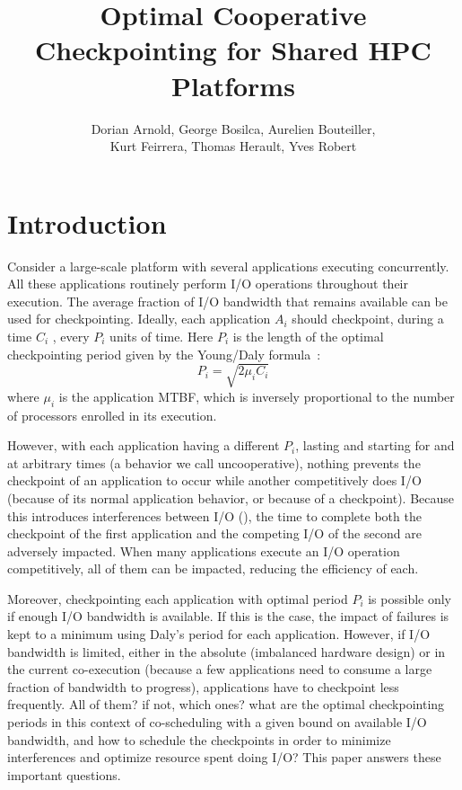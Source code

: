 \documentclass{article}
\author{Dorian Arnold, George Bosilca, Aurelien Bouteiller,\\
 Kurt Feirrera, Thomas Herault, Yves Robert}
\title{Optimal Cooperative Checkpointing for Shared HPC Platforms}
\begin{document}
\maketitle

\section{Introduction}

Consider a large-scale platform with several applications executing
concurrently. All these applications routinely perform I/O operations
throughout their execution. The average fraction of I/O bandwidth that
remains available can be used for checkpointing. Ideally, each application $A_{i}$
should checkpoint, during a time $C_{i}$ , 
every $P_{i}$ units of time. Here $P_{i}$ is the length of the
optimal checkpointing period given by the Young/Daly formula~\cite{young74,daly04}:
$$P_{i} = \sqrt{2 \mu_{i} C_{i}}$$
where $\mu_{i}$ is the application MTBF, which is inversely
proportional to the number of processors enrolled in its execution.
 
However, with each application having a different $P_{i}$, lasting and
starting for and at arbitrary times (a behavior we call
uncooperative), nothing prevents the checkpoint of an application to
occur while another competitively does I/O (because of its normal
application behavior, or because of a checkpoint). Because this
introduces interferences between I/O (\cite{interference}), the time
to complete both the checkpoint of the first application and the
competing I/O of the second are adversely impacted. When many
applications execute an I/O operation competitively, all of them can
be impacted, reducing the efficiency of each.

Moreover, checkpointing each application with optimal period $P_{i}$
is possible only if enough I/O bandwidth is available. If this is the
case, the impact of failures is kept to a minimum using Daly's period
for each application.  However, if I/O bandwidth is limited, either in
the absolute (imbalanced hardware design) or in the current
co-execution (because a few applications need to consume a large
fraction of bandwidth to progress), applications have to checkpoint
less frequently.  All of them? if not, which ones? what are the
optimal checkpointing periods in this context of co-scheduling with a
given bound on available I/O bandwidth, and how to schedule the
checkpoints in order to minimize interferences and optimize resource
spent doing I/O? This paper answers these important questions.
\end{document}
